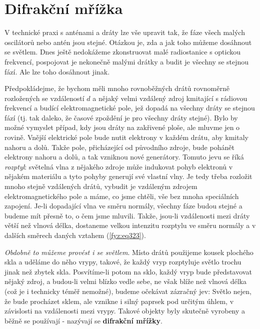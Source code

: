 {  \section{Difrakční mřížka}\label{fyz:IchapXXXsecII}
    V technické praxi s anténami a dráty lze vše upravit tak, že fáze všech malých oscilátorů nebo 
    antén jsou stejné. Otázkou je, zda a jak toho můžeme dosáhnout se světlem. Dnes ještě 
    nedokážeme zkonstruovat malé radiostanice s optickou frekvencí, pospojovat je nekonečně malými 
    drátky a budit je všechny se stejnou fází. Ale lze toho dosáhnout jinak.
    
    Předpokládejme, že bychom měli mnoho rovnoběžných drátů rovnoměrně rozložených se vzdáleností 
    \(d\) a nějaký velmi vzdálený zdroj kmitající s rádiovou frekvencí a budící elektromagnetické 
    pole, jež dopadá na všechny dráty se stejnou fází (tj. tak daleko, že časové zpoždění je pro 
    všechny dráty stejné). Bylo by možné vymyslet případ, kdy jsou dráty na zakřivené ploše, ale 
    mluvme jen o rovině. Vnější elektrické pole bude nutit elektrony v každém drátu, aby kmitaly 
    nahoru a dolů. Takže pole, přicházející od původního zdroje, bude pohánět elektrony nahoru a 
    dolů, a tak vzniknou nové generátory. Tomuto jevu se říká \emph{rozptyl}: světelná vlna z 
    nějakého zdroje může indukovat pohyb elektronů v nějakém materiálu a tyto pohyby generují své 
    vlastní vlny. Je tedy třeba rozložit mnoho stejně vzdálených drátů, vybudit je vzdáleným 
    zdrojem elektromagnetického pole a máme, co jsme chtěli, vše bez mnoha speciálních zapojení. 
    Je-li dopadající vlna ve směru normály, všechny fáze budou stejné a budeme mít přesně to, o čem 
    jsme mluvili. Takže, jsou-li vzdálenosti mezi dráty větší než vlnová délka, dostaneme velkou 
    intenzitu rozptylu ve směru normály a v dalších směrech daných vztahem (\ref{fyz:eq323}).
    
    \emph{Obdobně to můžeme provést i se světlem}. Místo drátů použijeme kousek plochého skla a 
    uděláme do něho vrypy, takové, že každý vryp rozptyluje světlo trochu jinak než zbytek skla. 
    Posvítíme-li potom na sklo, každý vryp bude představovat nějaký zdroj, a budou-li velmi blízko 
    vedle sebe, ne však blíže než vlnová délka (což je i technicky téměř nemožné), budeme očekávat 
    zázračný jev: Světlo nejen, že bude procházet sklem, ale vznikne i silný paprsek pod určitým 
    úhlem, v závislosti na vzdálenosti mezi vrypy. Takové objekty byly skutečně vyrobeny a běžně se 
    používají - nazývají se \textbf{difrakční mřížky}.
    
}
